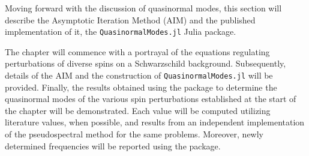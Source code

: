 Moving forward with the discussion of quasinormal modes, this section will describe the Asymptotic Iteration Method (AIM) and the published implementation of it, the \texttt{QuasinormalModes.jl} Julia package.

The chapter will commence with a portrayal of the equations regulating perturbations of diverse spins on a Schwarzschild background. Subsequently, details of the AIM and the construction of \texttt{QuasinormalModes.jl} will be provided. Finally, the results obtained using the package to determine the quasinormal modes of the various spin perturbations established at the start of the chapter will be demonstrated. Each value will be computed utilizing literature values, when possible, and results from an independent implementation of the pseudospectral method for the same problems. Moreover, newly determined frequencies will be reported using the package.